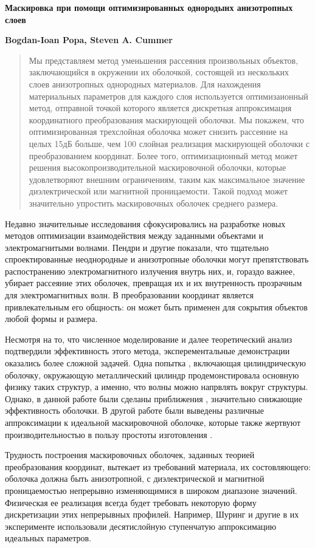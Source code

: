 \documentclass[a4paper, 12pt]{article}
\newcommand{\tit}[1]{\begin{center}{\bf{\Large #1}}\end{center}}
\newcommand{\aut}[1]{\centerline{{\bf #1}}}
\begin{document}
\sloppy
 \tit{Маскировка при помощи оптимизированных однородынх анизотропных слоев}
 \aut{Bogdan-Ioan Popa, Steven A. Cummer}

\begin{abstract}
Мы представляем метод уменьшения рассеяния произвольных объектов, заключающийся
в окружении их оболочкой, состоящей из нескольких слоев анизотропных однородных 
материалов. Для нахождения материальных параметров для каждого слоя используется
оптимизаионный метод, отправной точкой которого является дискретная аппроксимация
координатного преобразования маскирующей оболочки. Мы покажем, что оптимизированная
трехслойная оболочка может снизить рассеяние на целых 15дБ больше, чем 100 слойная
реализация маскирующей оболочки с преобразованием координат. Более того,
оптимизационный метод может решения высокопроизводительной маскировочной оболочки,
которые удовлетворяют внешним ограничениям, таким как максимальное значение
диэлектрической или магнитной проницаемости. Такой подход может значительно
упростить маскировочных оболочек среднего размера. 
\end{abstract}

Недавно значительные исследования сфокусировались на разработке новых
методов оптимизации взаимодействия между заданными объектами и электромагнитыми
волнами. Пендри и другие \cite{1} показали, что тщательно спроектированные
неоднородные и анизотропные оболочки могут препятствовать распостранению
электромагнитного излучения внутрь них, и, гораздо важнее, убирает рассеяние
этих оболочек, превращая их и их внутренность прозрачным для электромагнитных волн.
В преобразовании координат является привлекательным его общность: 
он может быть применен для сокрытия объектов любой формы и размера.

Несмотря на то, что численное моделирование \cite{2} и далее теоретический анализ
\cite{3} подтвердили эффективность этого метода, эксперементальные демонстрации
оказались более сложной задачей. Одна попытка \cite{4}, включающая цилиндрическую
оболочку, окружающую металлический цилиндр продемонстировала основную физику
таких структур, а именно, что волны можно напрвлять вокруг структуры. Однако,
в данной работе были сделаны приближения \cite{2}, значительно снижающие
эффективность оболочки. В другой работе были выведены различные аппроксимации
к идеальной маскировочной оболочке, которые также жертвуют производительностью
в пользу простоты изготовления \cite{5-7}.

Трудность построения маскировочных оболочек, заданных теорией преобразования
координат, вытекает из требований материала, их состовляющего: оболочка должна
быть анизотропной, с диэлектрической и магнитной проницаемостью непрерывно
изменяющимися в широком диапазоне значений. Физическая ее реализация 
всегда будет требовать некоторую форму дискретизации этих непрерывных профилей.
Например, Шуринг и другие \cite{4} в их эксперименте использовали десятислойную 
ступенчатую аппроксимацию идеальных параметров.
\end{document}
